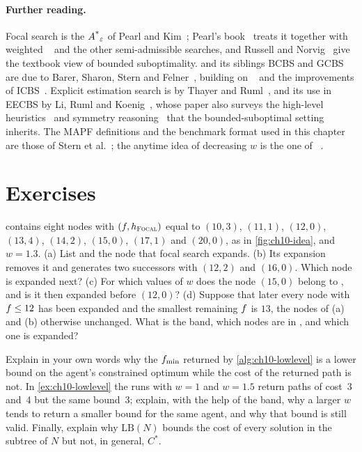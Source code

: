 \paragraph{Further reading.}
Focal search is the $A\textsuperscript{*}_\varepsilon$ of Pearl and Kim~\cite{pearl1982studies};
Pearl's book~\cite{pearl1984heuristics} treats it together with weighted
\astar~\cite{pohl1970heuristic} and the other semi-admissible searches, and
Russell and Norvig~\cite{russell2020aima} give the textbook view of bounded
suboptimality. \ecbs and its siblings BCBS and GCBS are due to Barer, Sharon,
Stern and Felner~\cite{barer2014ecbs}, building on \cbs~\cite{sharon2015cbs}
and the improvements of ICBS~\cite{boyarski2015icbs}. Explicit estimation
search is by Thayer and Ruml~\cite{thayer2011bounded}, and its use in EECBS
by Li, Ruml and Koenig~\cite{li2021eecbs}, whose paper also surveys the
high-level heuristics~\cite{felner2018adding} and symmetry
reasoning~\cite{li2019symmetry} that the bounded-suboptimal setting inherits.
The MAPF definitions and the benchmark format used in this chapter are those
of Stern et al.~\cite{stern2019mapf}; the anytime idea of decreasing $w$ is
the one of \arastar~\cite{likhachev2003ara}.

\section{Exercises}
\label{sec:ch10-exercises}

\begin{exercise}[\difficulty{1}]
\label{exr:ch10-focal-by-hand}
\Open contains eight nodes with $(f, h_{\textsc{Focal}})$ equal to
$(10, 3)$, $(11, 1)$, $(12, 0)$, $(13, 4)$, $(14, 2)$, $(15, 0)$, $(17, 1)$
and $(20, 0)$, as in \cref{fig:ch10-idea}, and $w = 1.3$.
(a) List \Focal and the node that focal search expands.
(b) Its expansion removes it and generates two successors with
$(12, 2)$ and $(16, 0)$. Which node is expanded next?
(c) For which values of $w$ does the node $(15, 0)$ belong to \Focal, and is
it then expanded before $(12, 0)$?
(d) Suppose that later every node with $f \le 12$ has been expanded and
the smallest remaining $f$ is $13$, the nodes of (a) and (b) otherwise
unchanged.
What is the band, which nodes are in \Focal, and which one is expanded?
\end{exercise}

\begin{exercise}[\difficulty{1}]
\label{exr:ch10-lower-bound}
Explain in your own words why the $f_{\min}$ returned by
\cref{alg:ch10-lowlevel} is a lower bound on the agent's constrained optimum
while the cost of the returned path is not. In \cref{ex:ch10-lowlevel} the runs
with $w = 1$ and $w = 1.5$ return paths of cost~3 and~4 but the same
bound~3; explain, with the help of the band, why a larger $w$ tends to return
a smaller bound for the same agent, and why that bound is still valid. Finally, explain
why $\mathrm{LB}(N)$ bounds the cost of every solution in the subtree of $N$
but not, in general, $C^*$.
\end{exercise}

